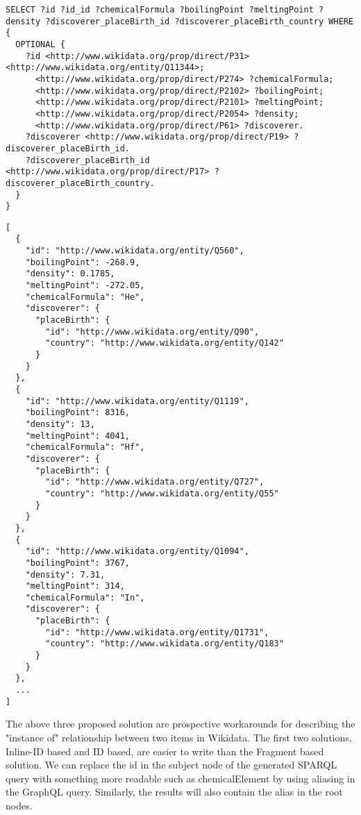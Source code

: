 \begin{minipage}{\linewidth}
\begin{lstlisting}[label=listing:listing27, caption={Generated SPARQL Query}]
SELECT ?id ?id_id ?chemicalFormula ?boilingPoint ?meltingPoint ?density ?discoverer_placeBirth_id ?discoverer_placeBirth_country WHERE {
  OPTIONAL {
    ?id <http://www.wikidata.org/prop/direct/P31> <http://www.wikidata.org/entity/Q11344>;
      <http://www.wikidata.org/prop/direct/P274> ?chemicalFormula;
      <http://www.wikidata.org/prop/direct/P2102> ?boilingPoint;
      <http://www.wikidata.org/prop/direct/P2101> ?meltingPoint;
      <http://www.wikidata.org/prop/direct/P2054> ?density;
      <http://www.wikidata.org/prop/direct/P61> ?discoverer.
    ?discoverer <http://www.wikidata.org/prop/direct/P19> ?discoverer_placeBirth_id.
    ?discoverer_placeBirth_id <http://www.wikidata.org/prop/direct/P17> ?discoverer_placeBirth_country.
  }
}
\end{lstlisting}
\end{minipage}

\begin{minipage}{\linewidth}
\begin{lstlisting}[label=listing:listing28, caption={Output}]
[
  {
    "id": "http://www.wikidata.org/entity/Q560",        
    "boilingPoint": -268.9,
    "density": 0.1785,
    "meltingPoint": -272.05,
    "chemicalFormula": "He",
    "discoverer": {
      "placeBirth": {
        "id": "http://www.wikidata.org/entity/Q90",     
        "country": "http://www.wikidata.org/entity/Q142"
      }
    }
  },
  {
    "id": "http://www.wikidata.org/entity/Q1119",       
    "boilingPoint": 8316,
    "density": 13,
    "meltingPoint": 4041,
    "chemicalFormula": "Hf",
    "discoverer": {
      "placeBirth": {
        "id": "http://www.wikidata.org/entity/Q727",
        "country": "http://www.wikidata.org/entity/Q55"
      }
    }
  },
  {
    "id": "http://www.wikidata.org/entity/Q1094",
    "boilingPoint": 3767,
    "density": 7.31,
    "meltingPoint": 314,
    "chemicalFormula": "In",
    "discoverer": {
      "placeBirth": {
        "id": "http://www.wikidata.org/entity/Q1731",
        "country": "http://www.wikidata.org/entity/Q183"
      }
    }
  },
  ...
]
\end{lstlisting}
\end{minipage}

The above three proposed solution are prospective workarounds for describing the "instance of" relationship between two items in Wikidata. The first two solutions, Inline-ID based and ID based, are easier to write than the Fragment based solution. We can replace the id in the subject node of the generated SPARQL query with something more readable such as chemicalElement by using aliasing in the GraphQL query. Similarly, the results will also contain the alias in the root nodes. 

